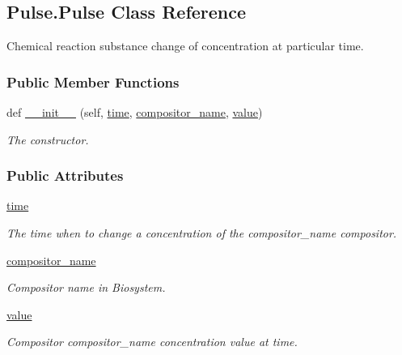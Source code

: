 \hypertarget{classPulse_1_1Pulse}{}\subsection{Pulse.\+Pulse Class Reference}
\label{classPulse_1_1Pulse}


Chemical reaction substance change of concentration at particular time.  


\subsubsection*{Public Member Functions}
\begin{DoxyCompactItemize}
\item 
def \hyperlink{classPulse_1_1Pulse_acc66099c7ff39345e3201503ffced78c}{\+\_\+\+\_\+init\+\_\+\+\_\+} (self, \hyperlink{classPulse_1_1Pulse_a092f89ee6ae7619b6bdc7c3d3dccc2d7}{time}, \hyperlink{classPulse_1_1Pulse_a85e4ce2663aa009215a67b5c905dd92d}{compositor\+\_\+name}, \hyperlink{classPulse_1_1Pulse_a4b3625886587f786b4e31e07fde48140}{value})
\begin{DoxyCompactList}\small\item\em The constructor. \end{DoxyCompactList}\end{DoxyCompactItemize}
\subsubsection*{Public Attributes}
\begin{DoxyCompactItemize}
\item 
\hyperlink{classPulse_1_1Pulse_a092f89ee6ae7619b6bdc7c3d3dccc2d7}{time}
\begin{DoxyCompactList}\small\item\em The time when to change a concentration of the {\ttfamily compositor\+\_\+name} compositor. \end{DoxyCompactList}\item 
\hyperlink{classPulse_1_1Pulse_a85e4ce2663aa009215a67b5c905dd92d}{compositor\+\_\+name}
\begin{DoxyCompactList}\small\item\em Compositor name in Biosystem. \end{DoxyCompactList}\item 
\hyperlink{classPulse_1_1Pulse_a4b3625886587f786b4e31e07fde48140}{value}
\begin{DoxyCompactList}\small\item\em Compositor {\ttfamily compositor\+\_\+name} concentration value at {\ttfamily time}. \end{DoxyCompactList}\end{DoxyCompactItemize}


